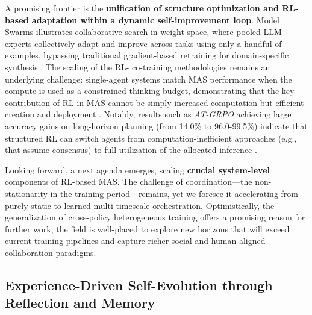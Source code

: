 \documentclass[11pt,a4paper]{article}
\begin{document}
A promising frontier is the \textbf{unification of structure optimization and RL-based adaptation within a dynamic self-improvement loop}. Model Swarms illustrates collaborative search in weight space, where pooled LLM experts collectively adapt and improve across tasks using only a handful of examples, bypassing traditional gradient-based retraining for domain-specific synthesis \cite{arxiv:2410.11163v2}. The scaling of the RL- co-training methodologies remains an underlying challenge: single-agent systems match MAS performance when the compute is used as a constrained thinking budget, demonstrating that the key contribution of RL in MAS cannot be simply increased computation but efficient creation and deployment \cite{arxiv:2604.02460v2}. Notably, results such as \emph{AT-GRPO} achieving large accuracy gains on long-horizon planning (from 14.0\% to 96.0-99.5\%) indicate that structured RL can switch agents from computation-inefficient approaches (e.g., that assume consensus) to full utilization of the allocated inference \cite{arxiv:2510.11062v5}.

Looking forward, a next agenda emerges, scaling \textbf{crucial system-level} components of RL-based MAS. The challenge of coordination---the non-stationarity in the training period---remains, yet we foresee it accelerating from purely static to learned multi-timescale orchestration. Optimistically, the generalization of cross-policy heterogeneous training offers a promising reason for further work; the field is well-placed to explore new horizons that will exceed current training pipelines and capture richer social and human-aligned collaboration paradigms.


\subsection{Experience-Driven Self-Evolution through Reflection and Memory}
\end{document}
